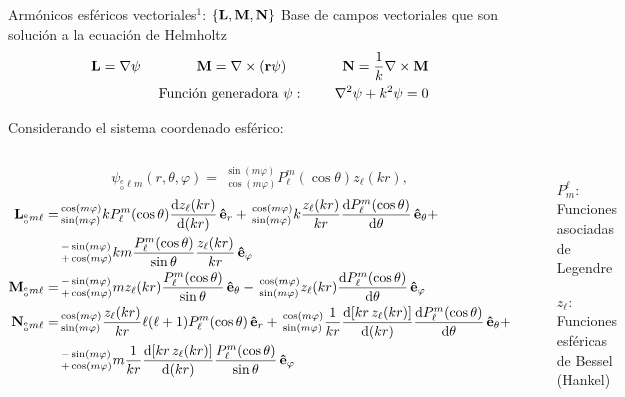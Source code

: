 

\begin{frame}{Armónicos esféricos vectoriales$^1$: $\{\vb{L},\vb{M}, \vb{N}\}$}
{Base de campos vectoriales que son solución a la ecuación de Helmholtz \hyperlink{fr:Apoyo}{\beamerreturnbutton{}}}\small
\begin{align*}
	\vb{L} = \nabla \psi \qquad \qquad
	\vb{M} = \nabla\times(\vb{r}\psi) \qquad \qquad
	\vb{N} =  \frac{1}{k}\nabla\times\vb{M} \\
	\text{Función generadora }\psi:\,\qquad\nabla^2 \psi + k^2 \psi = 0
\end{align*}%

 Considerando el sistema coordenado esférico:\\[1em]

\begin{columns}
$$ \psi_{ { }^{\text{e}}_{\text{o}}\ell m}(r,\theta,\varphi) =
			\, {\, }^{\sin(m\varphi)}_{\cos(m\varphi)}	P_\ell^m(\cos\theta)z_\ell(kr),$$
 \begin{align*}
 	\vb{L}_{{ }^{\text{e}}_{\text{o}} m\ell} =&
			{\, }^{\cos(m\varphi)}_{\sin(m\varphi)} k P_\ell^m(\cos\theta)\dv{z_\ell(kr)}{(kr)}\,\vu{e}_r
 			+ {\,}^{\cos(m\varphi)}_{\sin(m\varphi)} k\frac{z_\ell(kr)}{kr}\dv{P_\ell^m(\cos\theta)}{\theta} \,\vu{e}_\theta +  \\
			&  {\, }^{-\sin(m\varphi)}_{+\cos(m\varphi)} km \frac{P_\ell^m(\cos\theta)}{\sin\theta}\frac{z_\ell(kr)}{kr} \,\vu{e}_\varphi\\
	\vb{M}_{{ }^{\text{e}}_{\text{o}} m\ell} = &
			{\, }^{-\sin(m\varphi)}_{+\cos(m\varphi)} m z_\ell(kr) \frac{P_\ell^m(\cos\theta)}{\sin\theta}\,\vu{e}_\theta
			-{\, }^{\cos(m\varphi)}_{\sin(m\varphi)} z_\ell(kr) \dv{P_\ell^m(\cos\theta)}{\theta}(\cos\theta)\,\vu{e}_\varphi \\
	\vb{N}_{{ }^{\text{e}}_{\text{o}} m\ell} = &
			{\, }^{\cos(m\varphi)}_{\sin(m\varphi)} \frac{z_\ell(kr)}{kr} \ell(\ell+1)P_\ell^m(\cos\theta)\,\vu{e}_r
			+ {\, }^{\cos(m\varphi)}_{\sin(m\varphi)}  \frac{1}{kr} \dv{[kr\, z_\ell(kr)] }{(kr)}
						\dv{P_\ell^m(\cos\theta)}{\theta}(\cos\theta)\,\vu{e}_\theta +  \\
			&  {\, }^{-\sin(m\varphi)}_{+\cos(m\varphi)} m \frac{1}{kr} \dv{[kr\, z_\ell(kr)] }{(kr)}\frac{P_\ell^m(\cos\theta)}{\sin\theta}
		 \,\vu{e}_\varphi
 \end{align*}
\begin{itemize}
\item[$P_m^\ell$:] Funciones asociadas de Legendre
 \item[$z_\ell$:] Funciones esféricas de Bessel (Hankel)\\[1em]
 \end{itemize}


\end{columns}
\end{frame}
